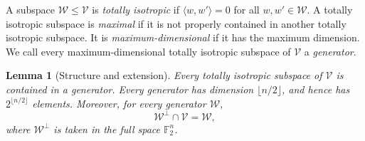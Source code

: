 \documentclass[11pt]{article}
\newtheorem{lemma}[theorem]{Lemma}
\begin{document}
A subspace \(\mathcal W\le\mathcal V\) is \emph{totally isotropic} if \(\langle w,w'\rangle=0\) for all \(w,w'\in\mathcal W\).  A totally isotropic subspace is \emph{maximal} if it is not properly contained in another totally isotropic subspace.  It is \emph{maximum-dimensional} if it has the maximum dimension.  We call every maximum-dimensional totally isotropic subspace of \(\mathcal V\) a \emph{generator}.

\begin{lemma}[Structure and extension]\label{lem:structure}
Every totally isotropic subspace of \(\mathcal V\) is contained in a
generator.  Every generator has dimension \(\lfloor n/2\rfloor\), and hence
has \(2^{\lfloor n/2\rfloor}\) elements.  Moreover, for every generator
\(\mathcal W\),
\[
 \mathcal W^\perp\cap\mathcal V=\mathcal W,
\]
where \(\mathcal W^\perp\) is taken in the full space
\(\mathbb F_2^n\).
\end{lemma}
\end{document}

